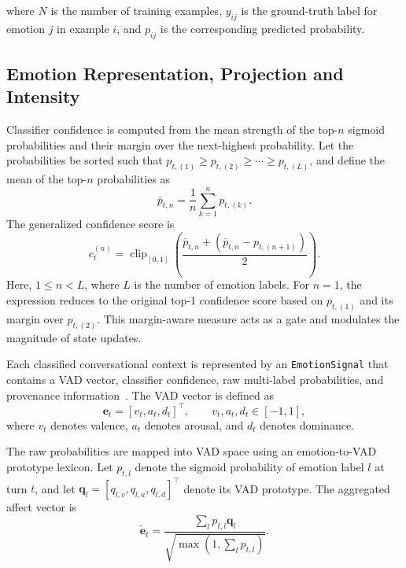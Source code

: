 \documentclass[graybox]{svmult}
\begin{document}
where $N$ is the number of training examples, $y_{ij}$ is the ground-truth label for emotion $j$ in example $i$, and $p_{ij}$ is the corresponding predicted probability.

\subsection{Emotion Representation, Projection and Intensity}
\label{subsec:emotion_representation}


Classifier confidence is computed from the mean strength of the top-$n$
sigmoid probabilities and their margin over the next-highest probability.
Let the probabilities be sorted such that
$p_{t,(1)} \geq p_{t,(2)} \geq \cdots \geq p_{t,(L)}$, and define the mean
of the top-$n$ probabilities as
\begin{equation}
\bar{p}_{t,n}=\frac{1}{n}\sum_{k=1}^{n}p_{t,(k)}.
\label{eq:top_n_mean}
\end{equation}
The generalized confidence score is
\begin{equation}
c_t^{(n)} =
\operatorname{clip}_{[0,1]}
\left(
\frac{\bar{p}_{t,n}+
\left(\bar{p}_{t,n}-p_{t,(n+1)}\right)}{2}
\right).
\label{eq:confidence}
\end{equation}
Here, $1 \leq n < L$, where $L$ is the number of emotion labels. For
$n=1$, the expression reduces to the original top-1 confidence score based
on $p_{t,(1)}$ and its margin over $p_{t,(2)}$. This margin-aware measure
acts as a gate and modulates the magnitude of state updates.


Each classified conversational context is represented by an \texttt{EmotionSignal} that contains a VAD vector, classifier confidence, raw multi-label probabilities, and provenance information~\cite{mehrabian1996pad,russell1980circumplex}. The VAD vector is defined as
\begin{equation}
\mathbf{e}_t = [v_t,a_t,d_t]^\top,
\qquad
v_t,a_t,d_t\in[-1,1],
\end{equation}
where $v_t$ denotes valence, $a_t$ denotes arousal, and $d_t$ denotes dominance.

The raw probabilities are mapped into VAD space using an emotion-to-VAD prototype lexicon. Let $p_{t,l}$ denote the sigmoid probability of emotion label $l$ at turn $t$, and let $\mathbf{q}_l=[q_{l,v},q_{l,a},q_{l,d}]^\top$ denote its VAD prototype. The aggregated affect vector is
\begin{equation}
\tilde{\mathbf{e}}_t
=
\frac{\sum_{l}p_{t,l}\mathbf{q}_l}
{\sqrt{\max(1,\sum_l p_{t,l})}}.
\label{eq:probs_vad}
\end{equation}
\end{document}
